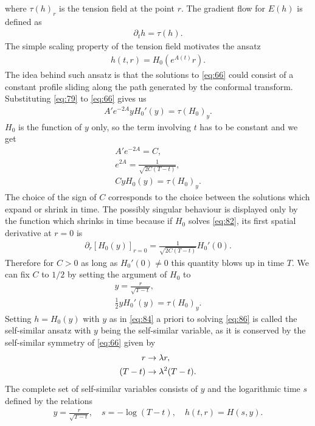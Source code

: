where $\tau(h)_r$ is the tension field at the point $r$. The gradient
flow for $E(h)$ is defined as
\begin{align}
  \label{eq:66}
  \partial_t h=\tau(h).
\end{align}
The simple scaling property of the tension field motivates the ansatz
\begin{align}
  \label{eq:79}
  h(t,r)=H_0(e^{A(t)}r).
\end{align}
The idea behind such ansatz is that the solutions to \eqref{eq:66}
could consist of a constant profile sliding along the path generated
by the conformal transform. Substituting \eqref{eq:79} to
\eqref{eq:66} gives us
\begin{align}
  \label{eq:80}
  A'e^{-2A}yH_0'(y)=\tau(H_0)_y.
\end{align}
$H_0$ is the function of $y$ only, so the term involving $t$ has to be
constant and we get
\begin{align}
  \label{eq:86}
  A'e^{-2A}=C,\\
  \label{eq:81}
  e^{2A}=\frac{1}{\sqrt{2C(T-t)}},\\
  \label{eq:82}
  CyH_0(y)=\tau(H_0)_y.
\end{align}
The choice of the sign of $C$ corresponds to the choice between the
solutions which expand or shrink in time. The possibly singular
behaviour is displayed only by the function which shrinks in time
because if $H_0$ solves \eqref{eq:82}, its first spatial derivative at
$r=0$ is
\begin{align}
  \label{eq:83}
  \partial_r\left[ H_0(y)\right]_{r=0} =\frac{1}{\sqrt{2C(T-t)}}H_0'(0).
\end{align}
Therefore for $C>0$ as long as $H_0'(0)\ne0$ this quantity blows up in
time $T$. We can fix $C$ to $1/2$ by setting the argument of $H_0$ to
\begin{align}
  \label{eq:84}
  y=\frac{r}{\sqrt{T-t}},\\
  \label{eq:85}
  \frac{1}{2}yH_0'(y)=\tau(H_0)_y.
\end{align}
Setting $h=H_0(y)$ with $y$ as in \eqref{eq:84} a priori to solving
\eqref{eq:86} is called the self-similar ansatz with $y$ being the
self-similar variable, as it is conserved by the self-similar symmetry
of \eqref{eq:66} given by
\begin{align}
  \label{eq:67}
  r&\rightarrow\lambda r,\\(T-t)&\rightarrow\lambda^2(T-t).
\end{align}
The complete set of self-similar variables consists of $y$ and the
logarithmic time $s$ defined by the relations
\begin{align}
  \label{eq:68}
  y=\frac{r}{\sqrt{T-t}},\quad s=-\log(T-t),\quad h(t,r)=H(s,y).
\end{align}

